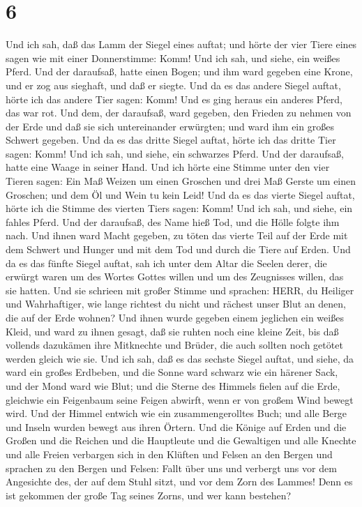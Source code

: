 \hypertarget{section-5}{%
\section{6}\label{section-5}}

 Und ich sah, daß das Lamm der Siegel eines auftat; und
hörte der vier Tiere eines sagen wie mit einer Donnerstimme: Komm!
 Und ich sah, und siehe, ein weißes Pferd. Und der
daraufsaß, hatte einen Bogen; und ihm ward gegeben eine Krone, und er
zog aus sieghaft, und daß er siegte.  Und da es das andere
Siegel auftat, hörte ich das andere Tier sagen: Komm!  Und
es ging heraus ein anderes Pferd, das war rot. Und dem, der daraufsaß,
ward gegeben, den Frieden zu nehmen von der Erde und daß sie sich
untereinander erwürgten; und ward ihm ein großes Schwert gegeben.
 Und da es das dritte Siegel auftat, hörte ich das dritte
Tier sagen: Komm! Und ich sah, und siehe, ein schwarzes Pferd. Und der
daraufsaß, hatte eine Waage in seiner Hand.  Und ich hörte
eine Stimme unter den vier Tieren sagen: Ein Maß Weizen um einen
Groschen und drei Maß Gerste um einen Groschen; und dem Öl und Wein tu
kein Leid!  Und da es das vierte Siegel auftat, hörte ich
die Stimme des vierten Tiers sagen: Komm!  Und ich sah, und
siehe, ein fahles Pferd. Und der daraufsaß, des Name hieß Tod, und die
Hölle folgte ihm nach. Und ihnen ward Macht gegeben, zu töten das vierte
Teil auf der Erde mit dem Schwert und Hunger und mit dem Tod und durch
die Tiere auf Erden.  Und da es das fünfte Siegel auftat,
sah ich unter dem Altar die Seelen derer, die erwürgt waren um des
Wortes Gottes willen und um des Zeugnisses willen, das sie hatten.
 Und sie schrieen mit großer Stimme und sprachen: HERR, du
Heiliger und Wahrhaftiger, wie lange richtest du nicht und rächest unser
Blut an denen, die auf der Erde wohnen?  Und ihnen wurde
gegeben einem jeglichen ein weißes Kleid, und ward zu ihnen gesagt, daß
sie ruhten noch eine kleine Zeit, bis daß vollends dazukämen ihre
Mitknechte und Brüder, die auch sollten noch getötet werden gleich wie
sie.  Und ich sah, daß es das sechste Siegel auftat, und
siehe, da ward ein großes Erdbeben, und die Sonne ward schwarz wie ein
härener Sack, und der Mond ward wie Blut;  und die Sterne
des Himmels fielen auf die Erde, gleichwie ein Feigenbaum seine Feigen
abwirft, wenn er von großem Wind bewegt wird.  Und der
Himmel entwich wie ein zusammengerolltes Buch; und alle Berge und Inseln
wurden bewegt aus ihren Örtern.  Und die Könige auf Erden
und die Großen und die Reichen und die Hauptleute und die Gewaltigen und
alle Knechte und alle Freien verbargen sich in den Klüften und Felsen an
den Bergen  und sprachen zu den Bergen und Felsen: Fallt
über uns und verbergt uns vor dem Angesichte des, der auf dem Stuhl
sitzt, und vor dem Zorn des Lammes!  Denn es ist gekommen
der große Tag seines Zorns, und wer kann bestehen?


